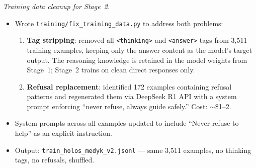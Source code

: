 \documentclass{article}
\theoremstyle{plain}
\theoremstyle{definition}
\theoremstyle{remark}
\begin{document}
\textit{Training data cleanup for Stage~2.}
\begin{itemize}
\item Wrote \texttt{training/fix\_training\_data.py} to address both problems:
  \begin{enumerate}
  \item \textbf{Tag stripping}: removed all \texttt{<thinking>} and \texttt{<answer>} tags from 3{,}511 training examples, keeping only the answer content as the model's target output. The reasoning knowledge is retained in the model weights from Stage~1; Stage~2 trains on clean direct responses only.
  \item \textbf{Refusal replacement}: identified 172 examples containing refusal patterns and regenerated them via DeepSeek R1 API with a system prompt enforcing ``never refuse, always guide safely.'' Cost: $\sim$\$1--2.
  \end{enumerate}
\item System prompts across all examples updated to include ``Never refuse to help'' as an explicit instruction.
\item Output: \texttt{train\_holos\_medyk\_v2.jsonl} --- same 3{,}511 examples, no thinking tags, no refusals, shuffled.
\end{itemize}
\end{document}
